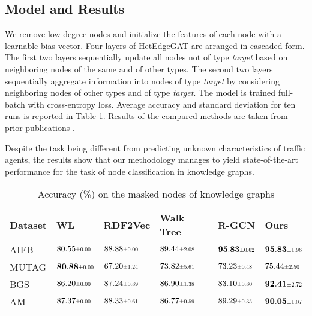 \documentclass[letterpaper, 10 pt, journal, twoside]{IEEEtran}
\newcommand\scalemath[2]{\scalebox{#1}{\mbox{\ensuremath{\displaystyle #2}}}}
\begin{document}
\subsection{Model and Results}
We remove low-degree nodes and initialize the features of each node with a learnable bias vector.
Four layers of HetEdgeGAT are arranged in cascaded form.
The first two layers sequentially update all nodes not of type \textit{target} based on neighboring nodes of the same and of other types.
The second two layers sequentially aggregate information into nodes of type \textit{target} by considering neighboring nodes of other types and of type \textit{target}.
The model is trained full-batch with cross-entropy loss.
Average accuracy and standard deviation for ten runs is reported in Table \ref{tab:results_kg}.
Results of the compared methods are taken from prior publications \cite{Schlichtkrull2018,  Vandewiele2019, Shervashidze2011, Ristoski2019}.

Despite the task being different from predicting unknown characteristics of traffic agents, the results show that our methodology manages to yield state-of-the-art performance for the task of node classification in knowledge graphs.

\begin{table}[!t]
	\scriptsize
	\caption{Accuracy (\%) on the masked nodes of knowledge graphs}
	\vspace{-0.1cm}
	\label{tab:results_kg}
	\setlength{\tabcolsep}{2pt}
	\centering
	\begin{tabularx}{\columnwidth}{Xlllll}
		\toprule
		Dataset & WL \cite{Shervashidze2011}                & RDF2Vec \cite{Ristoski2019}      & Walk Tree \cite{Vandewiele2019}  & R-GCN \cite{Schlichtkrull2018}            & Ours                                      \\ \midrule
		AIFB    & $80.55\scalemath{0.7}{\pm 0.00}$          & $88.88\scalemath{0.7}{\pm 0.00}$ & $89.44\scalemath{0.7}{\pm 2.08}$ & $\mathbf{95.83}\scalemath{0.7}{\pm 0.62}$ & $\mathbf{95.83}\scalemath{0.7}{\pm 1.96}$ \\
		MUTAG   & $\mathbf{80.88}\scalemath{0.7}{\pm 0.00}$ & $67.20\scalemath{0.7}{\pm 1.24}$ & $73.82\scalemath{0.7}{\pm 5.61}$ & $73.23\scalemath{0.7}{\pm 0.48}$          & $75.44\scalemath{0.7}{\pm 2.50}$          \\
		BGS     & $86.20\scalemath{0.7}{\pm 0.00}$          & $87.24\scalemath{0.7}{\pm 0.89}$ & $86.90\scalemath{0.7}{\pm 1.38}$ & $83.10\scalemath{0.7}{\pm 0.80}$          & $\mathbf{92.41}\scalemath{0.7}{\pm 2.72}$ \\
		AM      & $87.37\scalemath{0.7}{\pm 0.00}$          & $88.33\scalemath{0.7}{\pm 0.61}$ & $86.77\scalemath{0.7}{\pm 0.59}$ & $89.29\scalemath{0.7}{\pm 0.35}$          & $\mathbf{90.05}\scalemath{0.7}{\pm 1.07}$ \\ \bottomrule
	\end{tabularx}
	\vspace{-0.2cm}
\end{table} 
\end{document}
